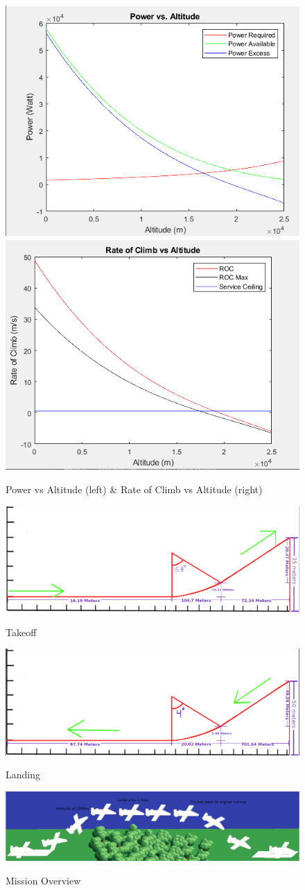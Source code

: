 \documentclass[12pt,A4paper]{article}
\begin{document}
	\begin{figure}[!h]
		\centering
		\includegraphics[width=.375\textwidth]{PowerVAltitude.png}\hspace{0.02 in} \label{fig:f5}
		\includegraphics[width=.375\textwidth]{RateofClimb.PNG} \label{fig:f6}
		\caption{Power vs Altitude (left) \& Rate of Climb vs Altitude (right)}
	\end{figure}
	\begin{figure}[!h]
		\centering
		\includegraphics[width=.75\textwidth]{TakeOff.PNG} \label{fig:f7}
		\caption{Takeoff}
	\end{figure}
	\begin{figure}[!h]
		\centering
		\includegraphics[width=.75\textwidth]{Landing.PNG} \label{fig:f8}
		\caption{Landing}
	\end{figure}
	\begin{figure}[!h]
		\centering
		\includegraphics[width=.75\textwidth]{Mission.PNG} \label{fig:f9}
		\caption{Mission Overview}
	\end{figure}
\end{document}
